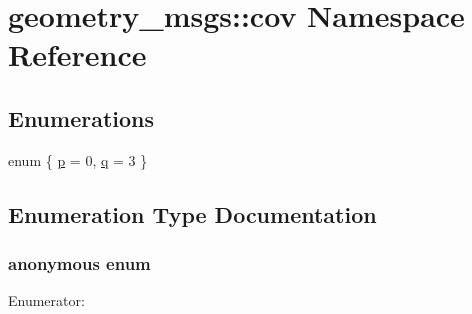 \hypertarget{namespacegeometry__msgs_1_1cov}{\section{geometry\-\_\-msgs\-:\-:cov Namespace Reference}
\label{namespacegeometry__msgs_1_1cov}
}
\subsection*{Enumerations}
\begin{DoxyCompactItemize}
\item 
enum \{ \hyperlink{namespacegeometry__msgs_1_1cov_a39ced537b52c13c965a0ccdfe23f4dd1a564e84fef1216ef14d3dbf7ed94cb357}{p} =  0, 
\hyperlink{namespacegeometry__msgs_1_1cov_a39ced537b52c13c965a0ccdfe23f4dd1a45bc9ae177afeb4ed8e0a975dc10b8e8}{q} =  3
 \}
\end{DoxyCompactItemize}


\subsection{Enumeration Type Documentation}
\hypertarget{namespacegeometry__msgs_1_1cov_a39ced537b52c13c965a0ccdfe23f4dd1}{\subsubsection[{anonymous enum}]{\setlength{\rightskip}{0pt plus 5cm}anonymous enum}}\label{namespacegeometry__msgs_1_1cov_a39ced537b52c13c965a0ccdfe23f4dd1}
\begin{Desc}
\item[Enumerator\-: ]\par
\begin{description}
\item[{\em 
\hypertarget{namespacegeometry__msgs_1_1cov_a39ced537b52c13c965a0ccdfe23f4dd1a564e84fef1216ef14d3dbf7ed94cb357}{p}\label{namespacegeometry__msgs_1_1cov_a39ced537b52c13c965a0ccdfe23f4dd1a564e84fef1216ef14d3dbf7ed94cb357}
}]\item[{\em 
\hypertarget{namespacegeometry__msgs_1_1cov_a39ced537b52c13c965a0ccdfe23f4dd1a45bc9ae177afeb4ed8e0a975dc10b8e8}{q}\label{namespacegeometry__msgs_1_1cov_a39ced537b52c13c965a0ccdfe23f4dd1a45bc9ae177afeb4ed8e0a975dc10b8e8}
}]\end{description}
\end{Desc}

